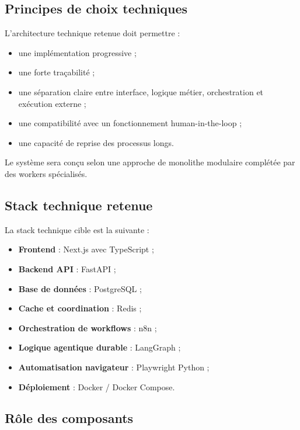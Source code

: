 \documentclass[11pt,a4paper]{article}
\begin{document}
\subsection{Principes de choix techniques}

L’architecture technique retenue doit permettre :

\begin{itemize}
    \item une implémentation progressive ;
    \item une forte traçabilité ;
    \item une séparation claire entre interface, logique métier, orchestration et exécution externe ;
    \item une compatibilité avec un fonctionnement human-in-the-loop ;
    \item une capacité de reprise des processus longs.
\end{itemize}

Le système sera conçu selon une approche de monolithe modulaire complétée par des workers spécialisés.

\subsection{Stack technique retenue}

La stack technique cible est la suivante :

\begin{itemize}
    \item \textbf{Frontend} : Next.js avec TypeScript ;
    \item \textbf{Backend API} : FastAPI ;
    \item \textbf{Base de données} : PostgreSQL ;
    \item \textbf{Cache et coordination} : Redis ;
    \item \textbf{Orchestration de workflows} : n8n ;
    \item \textbf{Logique agentique durable} : LangGraph ;
    \item \textbf{Automatisation navigateur} : Playwright Python ;
    \item \textbf{Déploiement} : Docker / Docker Compose.
\end{itemize}

\subsection{Rôle des composants}
\end{document}
